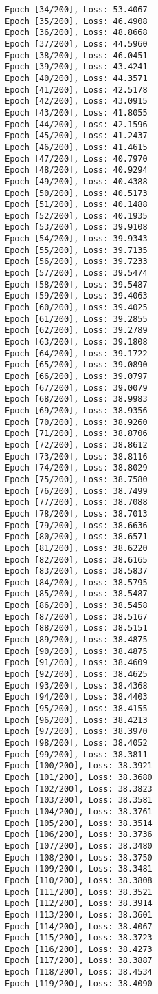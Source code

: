 \documentclass[11pt]{article}
\begin{document}
\begin{Verbatim}[commandchars=\\\{\}]
Epoch [34/200], Loss: 53.4067
Epoch [35/200], Loss: 46.4908
Epoch [36/200], Loss: 48.8668
Epoch [37/200], Loss: 44.5960
Epoch [38/200], Loss: 46.0451
Epoch [39/200], Loss: 43.4241
Epoch [40/200], Loss: 44.3571
Epoch [41/200], Loss: 42.5178
Epoch [42/200], Loss: 43.0915
Epoch [43/200], Loss: 41.8055
Epoch [44/200], Loss: 42.1596
Epoch [45/200], Loss: 41.2437
Epoch [46/200], Loss: 41.4615
Epoch [47/200], Loss: 40.7970
Epoch [48/200], Loss: 40.9294
Epoch [49/200], Loss: 40.4388
Epoch [50/200], Loss: 40.5173
Epoch [51/200], Loss: 40.1488
Epoch [52/200], Loss: 40.1935
Epoch [53/200], Loss: 39.9108
Epoch [54/200], Loss: 39.9343
Epoch [55/200], Loss: 39.7135
Epoch [56/200], Loss: 39.7233
Epoch [57/200], Loss: 39.5474
Epoch [58/200], Loss: 39.5487
Epoch [59/200], Loss: 39.4063
Epoch [60/200], Loss: 39.4025
Epoch [61/200], Loss: 39.2855
Epoch [62/200], Loss: 39.2789
Epoch [63/200], Loss: 39.1808
Epoch [64/200], Loss: 39.1722
Epoch [65/200], Loss: 39.0890
Epoch [66/200], Loss: 39.0797
Epoch [67/200], Loss: 39.0079
Epoch [68/200], Loss: 38.9983
Epoch [69/200], Loss: 38.9356
Epoch [70/200], Loss: 38.9260
Epoch [71/200], Loss: 38.8706
Epoch [72/200], Loss: 38.8612
Epoch [73/200], Loss: 38.8116
Epoch [74/200], Loss: 38.8029
Epoch [75/200], Loss: 38.7580
Epoch [76/200], Loss: 38.7499
Epoch [77/200], Loss: 38.7088
Epoch [78/200], Loss: 38.7013
Epoch [79/200], Loss: 38.6636
Epoch [80/200], Loss: 38.6571
Epoch [81/200], Loss: 38.6220
Epoch [82/200], Loss: 38.6165
Epoch [83/200], Loss: 38.5837
Epoch [84/200], Loss: 38.5795
Epoch [85/200], Loss: 38.5487
Epoch [86/200], Loss: 38.5458
Epoch [87/200], Loss: 38.5167
Epoch [88/200], Loss: 38.5151
Epoch [89/200], Loss: 38.4875
Epoch [90/200], Loss: 38.4875
Epoch [91/200], Loss: 38.4609
Epoch [92/200], Loss: 38.4625
Epoch [93/200], Loss: 38.4368
Epoch [94/200], Loss: 38.4403
Epoch [95/200], Loss: 38.4155
Epoch [96/200], Loss: 38.4213
Epoch [97/200], Loss: 38.3970
Epoch [98/200], Loss: 38.4052
Epoch [99/200], Loss: 38.3811
Epoch [100/200], Loss: 38.3921
Epoch [101/200], Loss: 38.3680
Epoch [102/200], Loss: 38.3823
Epoch [103/200], Loss: 38.3581
Epoch [104/200], Loss: 38.3761
Epoch [105/200], Loss: 38.3514
Epoch [106/200], Loss: 38.3736
Epoch [107/200], Loss: 38.3480
Epoch [108/200], Loss: 38.3750
Epoch [109/200], Loss: 38.3481
Epoch [110/200], Loss: 38.3808
Epoch [111/200], Loss: 38.3521
Epoch [112/200], Loss: 38.3914
Epoch [113/200], Loss: 38.3601
Epoch [114/200], Loss: 38.4067
Epoch [115/200], Loss: 38.3723
Epoch [116/200], Loss: 38.4273
Epoch [117/200], Loss: 38.3887
Epoch [118/200], Loss: 38.4534
Epoch [119/200], Loss: 38.4090

\end{Verbatim}
\end{document}

